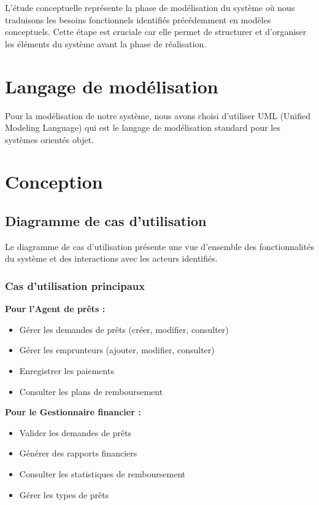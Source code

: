 \documentclass[12pt,a4paper]{report}
\begin{document}
L'étude conceptuelle représente la phase de modélisation du système où nous traduisons les besoins fonctionnels identifiés précédemment en modèles conceptuels. Cette étape est cruciale car elle permet de structurer et d'organiser les éléments du système avant la phase de réalisation.

\section{Langage de modélisation}

Pour la modélisation de notre système, nous avons choisi d'utiliser UML (Unified Modeling Language) qui est le langage de modélisation standard pour les systèmes orientés objet.

\section{Conception}

\subsection{Diagramme de cas d'utilisation}

Le diagramme de cas d'utilisation présente une vue d'ensemble des fonctionnalités du système et des interactions avec les acteurs identifiés.

\subsubsection{Cas d'utilisation principaux}

\textbf{Pour l'Agent de prêts :}
\begin{itemize}
    \item Gérer les demandes de prêts (créer, modifier, consulter)
    \item Gérer les emprunteurs (ajouter, modifier, consulter)
    \item Enregistrer les paiements
    \item Consulter les plans de remboursement
\end{itemize}

\textbf{Pour le Gestionnaire financier :}
\begin{itemize}
    \item Valider les demandes de prêts
    \item Générer des rapports financiers
    \item Consulter les statistiques de remboursement
    \item Gérer les types de prêts
\end{itemize}
\end{document}
